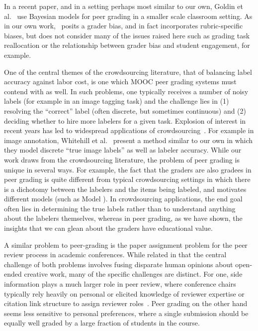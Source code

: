 

In a recent paper, and in a setting perhaps most similar to our
own, Goldin et al.~\cite{goldin11,ashley11,goldin12} use Bayesian models for peer grading in a smaller scale classroom setting. As in our
own work,~\cite{goldin12} posits a grader bias, and in fact incorporates
rubric-specific biases, but does not consider many of the
issues raised here such as grading task reallocation or the
relationship between grader bias and student engagement,
for example.

One of the central themes of the crowdsourcing literature, that of balancing label accuracy against labor cost, is one which MOOC peer grading 
systems must contend with as well.
In such problems, one typically receives a number of noisy labels (for example in an image tagging task)
and the challenge lies in (1) resolving the ``correct'' label (often discrete, but sometimes continuous) 
and (2) deciding whether to hire more labelers for a given task.  
Explosion of interest in recent years has led to widespread applications of crowdsourcing~\cite{bachrach12,kamar12}.
For example in image annotation, Whitehill et al.~\cite{whitehill09} present a method similar to our
own in which they model discrete ``true image labels'' as well as labeler accuracy.
While our work draws from the crowdsourcing literature, the problem of peer grading is unique in several ways. For example,
the fact that the graders are also gradees in peer grading is
quite different from typical crowdsourcing settings in which there is a dichotomy between the labelers
and the items being labeled, and motivates different models (such as Model \PGthree). In crowdsourcing applications,
 the end goal often lies in determining the true labels rather than to understand anything
about the labelers themselves, whereas in peer grading, as we have shown, the insights that we can glean about the
graders have educational value.


A similar problem to peer-grading is the paper assignment problem for the peer review process in academic conferences.  
While related in that the central challenge of both problems involves fusing disparate human opinions about open-ended creative work,
many of the specific challenges are distinct.
For one, side information plays a much larger role in peer review, where conference chairs typically
rely heavily on personal or elicited knowledge of reviewer expertise or citation link structure to assign reviewer roles~\cite{charlin11}.
Peer grading on the other hand seems less sensitive to personal preferences, where a single submission should be equally
well graded by a large fraction of students in the course.

